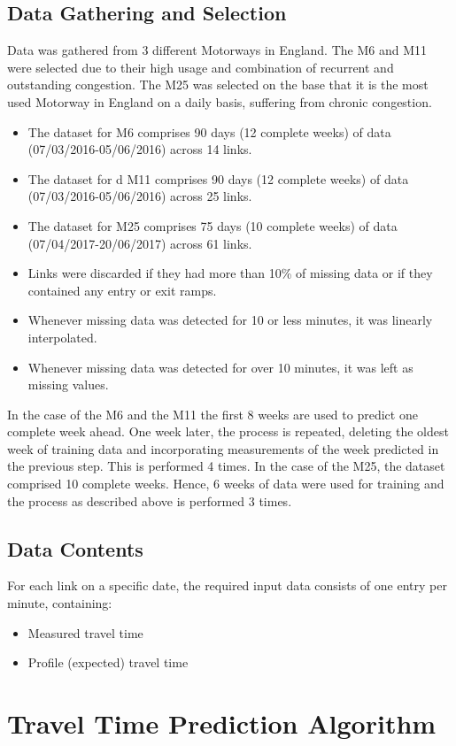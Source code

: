 \documentclass[conference, letterpaper]{IEEEtran}
\begin{document}
\subsection{Data Gathering and Selection}
Data was gathered from 3 different Motorways in England.
The M6 and M11 were selected due to their high usage and combination of recurrent and outstanding congestion. 
The M25 was selected on the base that it is the most used Motorway in England on a daily basis, suffering from chronic congestion.
\begin{itemize}
	\item The dataset for M6 comprises 90 days (12 complete weeks) of data (07/03/2016-05/06/2016) across 14 links.
	\item The dataset for d M11 comprises 90 days (12 complete weeks) of data (07/03/2016-05/06/2016) across 25 links.
	\item The dataset for M25 comprises 75 days (10 complete weeks) of data (07/04/2017-20/06/2017) across 61 links.
	\item Links were discarded if they had more than 10\% of missing data or if they contained any entry or exit ramps.
	\item Whenever missing data was detected for 10 or less minutes, it was linearly interpolated.
	\item Whenever missing data was detected for over 10 minutes, it was left as missing values.
\end{itemize}
In the case of the M6 and the M11 the first 8 weeks are used to predict one complete week ahead.
One week later, the process is repeated, deleting the oldest week of training data and incorporating measurements of the week predicted in the previous step. This is performed 4 times.
In the case of the M25, the dataset comprised 10 complete weeks. 
Hence, 6 weeks of data were used for training and the process as described above is performed 3 times.
\subsection{Data Contents}
For each link on a specific date, the required input data consists of one entry per minute, containing:
\begin{itemize}
	\item Measured travel time
	\item Profile (expected) travel time 	
\end{itemize}


\section{Travel Time Prediction Algorithm} \label{algorithm}
\end{document}
